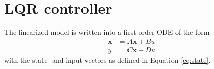\section{LQR controller}\label{app:lqr}
%

%
%
%
The linearized model is written into a first order ODE of the form
\begin{align}\label{eq:app.ss}
\mathbf{\dot{x} }&=A\mathbf{x}+Bu\\
y&=C\mathbf{x}+Du
\end{align}
with the state- and input vectors as defined in Equation \ref{eq:state}.
